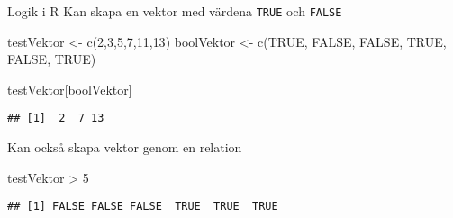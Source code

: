 \documentclass[
  10pt,
  ignorenonframetext,
]{beamer}
\newenvironment{Shaded}{\begin{snugshade}}{\end{snugshade}}
\newcommand{\ConstantTok}[1]{\textcolor[rgb]{0.00,0.00,0.00}{#1}}
\newcommand{\DecValTok}[1]{\textcolor[rgb]{0.00,0.00,0.81}{#1}}
\newcommand{\FunctionTok}[1]{\textcolor[rgb]{0.00,0.00,0.00}{#1}}
\newcommand{\NormalTok}[1]{#1}
\newcommand{\OtherTok}[1]{\textcolor[rgb]{0.56,0.35,0.01}{#1}}
\newcommand{\SpecialCharTok}[1]{\textcolor[rgb]{0.00,0.00,0.00}{#1}}
\begin{document}


\begin{frame}[fragile]{Logik i R}
\protect\hypertarget{logik-i-r}{}
Kan skapa en vektor med värdena \texttt{TRUE} och \texttt{FALSE}

\begin{Shaded}
\begin{Highlighting}[]
\NormalTok{testVektor }\OtherTok{\textless{}{-}} \FunctionTok{c}\NormalTok{(}\DecValTok{2}\NormalTok{,}\DecValTok{3}\NormalTok{,}\DecValTok{5}\NormalTok{,}\DecValTok{7}\NormalTok{,}\DecValTok{11}\NormalTok{,}\DecValTok{13}\NormalTok{)}
\NormalTok{boolVektor }\OtherTok{\textless{}{-}} \FunctionTok{c}\NormalTok{(}\ConstantTok{TRUE}\NormalTok{, }\ConstantTok{FALSE}\NormalTok{, }\ConstantTok{FALSE}\NormalTok{, }\ConstantTok{TRUE}\NormalTok{, }\ConstantTok{FALSE}\NormalTok{, }\ConstantTok{TRUE}\NormalTok{)}
\end{Highlighting}
\end{Shaded}

\begin{Shaded}
\begin{Highlighting}[]
\NormalTok{testVektor[boolVektor]}
\end{Highlighting}
\end{Shaded}

\pause

\begin{verbatim}
## [1]  2  7 13
\end{verbatim}

\pause

Kan också skapa vektor genom en relation

\begin{Shaded}
\begin{Highlighting}[]
\NormalTok{testVektor }\SpecialCharTok{\textgreater{}} \DecValTok{5}
\end{Highlighting}
\end{Shaded}

\begin{verbatim}
## [1] FALSE FALSE FALSE  TRUE  TRUE  TRUE
\end{verbatim}
\end{frame}

\end{document}
